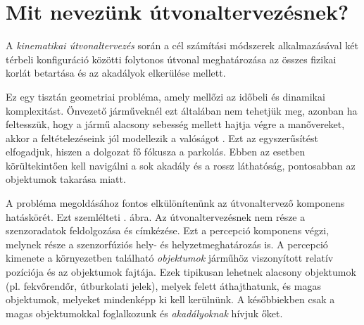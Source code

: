 \documentclass{article}
\begin{document}
\section{Mit nevezünk útvonaltervezésnek?}
A \textit{kinematikai útvonaltervezés} során a cél számítási módszerek alkalmazásával két térbeli konfiguráció közötti folytonos útvonal meghatározása az összes fizikai korlát betartása és az akadályok elkerülése mellett.

Ez egy tisztán geometriai probléma, amely mellőzi az időbeli és dinamikai komplexitást. Önvezető járműveknél ezt általában nem tehetjük meg, azonban ha feltesszük, hogy a jármű alacsony sebesség mellett hajtja végre a manővereket, akkor a feltételezéseink jól modellezik a valóságot \cite{polack2017kinematicBicycleModel}. Ezt az egyszerűsítést elfogadjuk, hiszen a dolgozat fő fókusza a parkolás. Ebben az esetben körültekintően kell navigálni a sok akadály és a rossz láthatóság, pontosabban az objektumok takarása miatt.

A probléma megoldásához fontos elkülönítenünk az útvonaltervező komponens hatáskörét. Ezt szemlélteti . ábra. Az útvonaltervezésnek nem része a szenzoradatok feldolgozása és címkézése. Ezt a percepció komponens végzi, melynek része a szenzorfúziós hely- és helyzetmeghatározás is. A percepció kimenete a környezetben található \textit{objektumok} járműhöz viszonyított relatív pozíciója és az objektumok fajtája. Ezek tipikusan lehetnek alacsony objektumok (pl. fekvőrendőr, útburkolati jelek), melyek felett áthajthatunk, és magas objektumok, melyeket mindenképp ki kell kerülnünk. A későbbiekben csak a magas objektumokkal foglalkozunk és \textit{akadályoknak} hívjuk őket.
\end{document}
